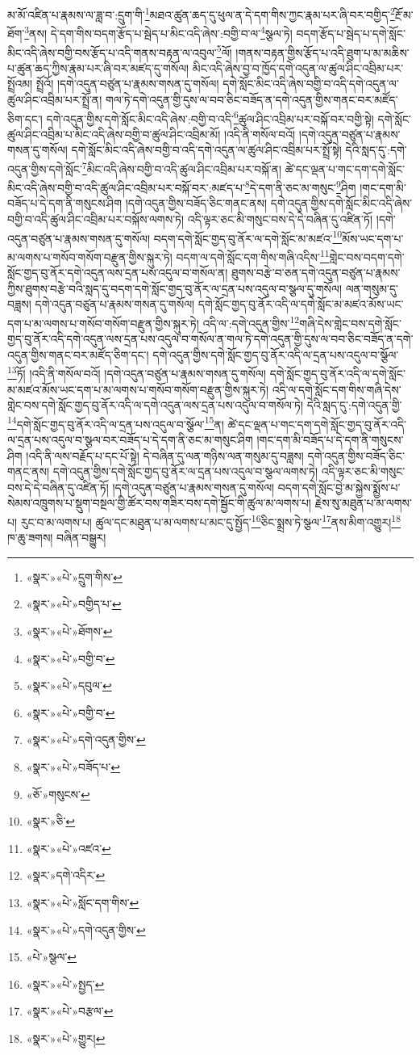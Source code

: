 མ་མོ་འཛིན་པ་རྣམས་ལ་ཟླ་བ་:དྲུག་གི་\footnote{«སྣར་»«པེ་»དྲུག་གིས་}མཐའ་ཚུན་ཆད་དུ་ཕུལ་ན་དེ་དག་གིས་ཀྱང་རྣམ་པར་ཞི་བར་བགྱིད་\footnote{«སྣར་»«པེ་»བགྱིད་པ་}རྔོ་མ་ཐོག་\footnote{«སྣར་»«པེ་»ཐོགས་}ནས། དེ་དག་གིས་བདག་རྩོད་པ་སྦེད་པ་མིང་འདི་ཞེས་:བགྱི་བ་ལ་\footnote{«སྣར་»«པེ་»བགྱི་བ་}སྩལ་ཏེ། བདག་རྩོད་པ་སྦེད་པ་དགེ་སློང་མིང་འདི་ཞེས་བགྱི་བས་རྩོད་པ་འདི་གནས་བརྟན་ལ་འབུལ་\footnote{«སྣར་»«པེ་»དབུལ་}ལོ། །གནས་བརྟན་གྱིས་རྩོད་པ་འདི་ཐུག་པ་མ་མཆིས་པ་ཚུན་ཆད་ཀྱིས་རྣམ་པར་ཞི་བར་མཛད་དུ་གསོལ། མིང་འདི་ཞེས་བྱ་བ་ཁྱོད་དགེ་འདུན་ལ་ཚུལ་ཤིང་འབྲིམ་པར་སྤྲོའམ། སྤྲོའོ། །དགེ་འདུན་བཙུན་པ་རྣམས་གསན་དུ་གསོལ། དགེ་སློང་མིང་འདི་ཞེས་བགྱི་བ་འདི་དགེ་འདུན་ལ་ཚུལ་ཤིང་འབྲིམ་པར་སྤྲོ་ན། གལ་ཏེ་དགེ་འདུན་གྱི་དུས་ལ་བབ་ཅིང་བཟོད་ན་དགེ་འདུན་གྱིས་གནང་བར་མཛོད་ཅིག་དང་། དགེ་འདུན་གྱིས་དགེ་སློང་མིང་འདི་ཞེས་:བགྱི་བ་འདི་\footnote{«སྣར་»«པེ་»བགྱི་བ་}ཚུལ་ཤིང་འབྲིམ་པར་བསྐོ་བར་བགྱི་སྟེ། དགེ་སློང་ཚུལ་ཤིང་འབྲིམ་པ་མིང་འདི་ཞེས་བགྱི་བ་ཚུལ་ཤིང་འབྲིམ་མོ། །འདི་ནི་གསོལ་བའོ། །དགེ་འདུན་བཙུན་པ་རྣམས་གསན་དུ་གསོལ། དགེ་སློང་མིང་འདི་ཞེས་བགྱི་བ་འདི་དགེ་འདུན་ལ་ཚུལ་ཤིང་འབྲིམ་པར་སྤྲོ་སྟེ། དེའི་སླད་དུ་:དགེ་འདུན་གྱིས་དགེ་སློང་\footnote{«སྣར་»«པེ་»དགེ་འདུན་གྱིས་}མིང་འདི་ཞེས་བགྱི་བ་འདི་ཚུལ་ཤིང་འབྲིམ་པར་བསྐོ་ན། ཚེ་དང་ལྡན་པ་གང་དག་དགེ་སློང་མིང་འདི་ཞེས་བགྱི་བ་འདི་ཚུལ་ཤིང་འབྲིམ་པར་བསྐོ་བར་:མཛད་པ་\footnote{«སྣར་»«པེ་»བཟོད་པ་}དེ་དག་ནི་ཅང་མ་གསུང་\footnote{«ཅོ་»གསུངས་}ཤིག །གང་དག་མི་བཟོད་པ་དེ་དག་ནི་གསུངས་ཤིག །དགེ་འདུན་གྱིས་བཟོད་ཅིང་གནང་ནས། དགེ་འདུན་གྱིས་དགེ་སློང་མིང་འདི་ཞེས་བགྱི་བ་འདི་ཚུལ་ཤིང་འབྲིམ་པར་བསྐོས་ལགས་ཏེ། འདི་ལྟར་ཅང་མི་གསུང་བས་དེ་དེ་བཞིན་དུ་འཛིན་ཏོ། །དགེ་འདུན་བཙུན་པ་རྣམས་གསན་དུ་གསོལ། བདག་དགེ་སློང་གྱད་བུ་ནོར་ལ་དགེ་སློང་མ་མཛའ་\footnote{«སྣར་»ཅི་}མོས་ཡང་དག་པ་མ་ལགས་པ་གསོབ་གསོག་བརྫུན་གྱིས་སྐུར་ཏེ། བདག་ལ་དགེ་སློང་དག་གིས་གཞི་འདིས་\footnote{«སྣར་»«པེ་»འཛའ་}གླེང་བས་བདག་དགེ་སློང་གྱད་བུ་ནོར་དགེ་འདུན་ལས་དྲན་པས་འདུལ་བ་གསོལ་ན། ཐུགས་བརྩེ་བ་ཅན་དགེ་འདུན་བཙུན་པ་རྣམས་ཀྱིས་ཐུགས་བརྩེ་བའི་སླད་དུ་བདག་དགེ་སློང་གྱད་བུ་ནོར་ལ་དྲན་པས་འདུལ་བ་སྩལ་དུ་གསོལ། ལན་གསུམ་དུ་བཟླས། དགེ་འདུན་བཙུན་པ་རྣམས་གསན་དུ་གསོལ། དགེ་སློང་གྱད་བུ་ནོར་འདི་ལ་དགེ་སློང་མ་མཛའ་མོས་ཡང་དག་པ་མ་ལགས་པ་གསོབ་གསོག་བརྫུན་གྱིས་སྐུར་ཏེ། འདི་ལ་:དགེ་འདུན་གྱིས་\footnote{«སྣར་»དགེ་འདིར་}གཞི་དེས་གླེང་བས་དགེ་སློང་གྱད་བུ་ནོར་འདི་དགེ་འདུན་ལས་དྲན་པས་འདུལ་བ་གསོལ་ན་གལ་ཏེ་དགེ་འདུན་གྱི་དུས་ལ་བབ་ཅིང་བཟོད་ན་དགེ་འདུན་གྱིས་གནང་བར་མཛོད་ཅིག་དང་། དགེ་འདུན་གྱིས་དགེ་སློང་གྱད་བུ་ནོར་འདི་ལ་དྲན་པས་འདུལ་བ་སྩོལ་\footnote{«སྣར་»«པེ་»སློང་དག་གིས་}ཏོ། །འདི་ནི་གསོལ་བའོ། །དགེ་འདུན་བཙུན་པ་རྣམས་གསན་དུ་གསོལ། དགེ་སློང་གྱད་བུ་ནོར་འདི་ལ་དགེ་སློང་མ་མཛའ་མོས་ཡང་དག་པ་མ་ལགས་པ་གསོབ་གསོག་བརྫུན་གྱིས་སྐུར་ཏེ། འདི་ལ་དགེ་སློང་དག་གིས་གཞི་དེས་གླེང་བས་དགེ་སློང་གྱད་བུ་ནོར་འདི་ལ་དགེ་འདུན་ལས་དྲན་པས་འདུལ་བ་གསོལ་ཏེ། དེའི་སླད་དུ་:དགེ་འདུན་གྱི་\footnote{«སྣར་»«པེ་»དགེ་འདུན་གྱིས་}དགེ་སློང་གྱད་བུ་ནོར་འདི་ལ་དྲན་པས་འདུལ་བ་སྩོལ་\footnote{«པེ་»སྩལ་}ན། ཚེ་དང་ལྡན་པ་གང་དག་དགེ་སློང་གྱད་བུ་ནོར་འདི་ལ་དྲན་པས་འདུལ་བ་སྩལ་བར་བཟོད་པ་དེ་དག་ནི་ཅང་མ་གསུང་ཤིག །གང་དག་མི་བཟོད་པ་དེ་དག་ནི་གསུངས་ཤིག །འདི་ནི་ལས་བརྗོད་པ་དང་པོ་སྟེ། དེ་བཞིན་དུ་ལན་གཉིས་ལན་གསུམ་དུ་བཟླས། དགེ་འདུན་གྱིས་བཟོད་ཅིང་གནང་ནས། དགེ་འདུན་གྱིས་དགེ་སློང་གྱད་བུ་ནོར་ལ་དྲན་པས་འདུལ་བ་སྩལ་ལགས་ཏེ། འདི་ལྟར་ཅང་མི་གསུང་བས་དེ་དེ་བཞིན་དུ་འཛིན་ཏོ། །དགེ་འདུན་བཙུན་པ་རྣམས་གསན་དུ་གསོལ། བདག་དགེ་སློང་བྱེ་མ་སྐྱེས་སྨྱོས་པ་སེམས་འཁྲུགས་པ་སྡུག་བསྔལ་གྱི་ཚོར་བས་གཟིར་བས་དགེ་སྦྱོང་གི་ཚུལ་མ་ལགས་པ། རྗེས་སུ་མཐུན་པ་མ་ལགས་པ། རུང་བ་མ་ལགས་པ། ཚུལ་དང་མཐུན་པ་མ་ལགས་པ་མང་དུ་སྤྱོད་\footnote{«སྣར་»«པེ་»སྤྱད་}ཅིང་སྨྲས་ཏེ་སྩལ་\footnote{«སྣར་»«པེ་»བརྩལ་}ནས་མིག་འགྱུར།\footnote{«སྣར་»«པེ་»གྱུར།} ཁ་ཆུ་ཟགས། བཞིན་བསྒྱུར། 